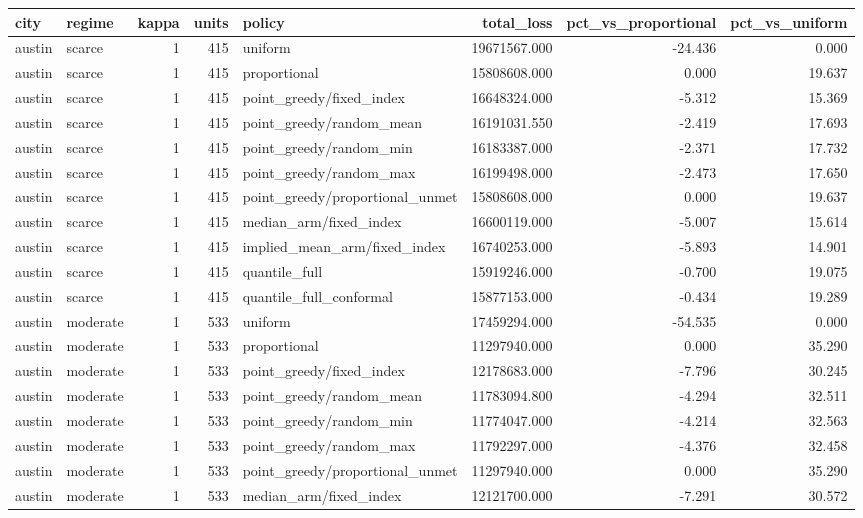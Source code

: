 \begin{tabular}{llrrlrrr}
\toprule
city & regime & kappa & units & policy & total\_loss & pct\_vs\_proportional & pct\_vs\_uniform \\
\midrule
austin & scarce & 1 & 415 & uniform & 19671567.000 & -24.436 & 0.000 \\
austin & scarce & 1 & 415 & proportional & 15808608.000 & 0.000 & 19.637 \\
austin & scarce & 1 & 415 & point\_greedy/fixed\_index & 16648324.000 & -5.312 & 15.369 \\
austin & scarce & 1 & 415 & point\_greedy/random\_mean & 16191031.550 & -2.419 & 17.693 \\
austin & scarce & 1 & 415 & point\_greedy/random\_min & 16183387.000 & -2.371 & 17.732 \\
austin & scarce & 1 & 415 & point\_greedy/random\_max & 16199498.000 & -2.473 & 17.650 \\
austin & scarce & 1 & 415 & point\_greedy/proportional\_unmet & 15808608.000 & 0.000 & 19.637 \\
austin & scarce & 1 & 415 & median\_arm/fixed\_index & 16600119.000 & -5.007 & 15.614 \\
austin & scarce & 1 & 415 & implied\_mean\_arm/fixed\_index & 16740253.000 & -5.893 & 14.901 \\
austin & scarce & 1 & 415 & quantile\_full & 15919246.000 & -0.700 & 19.075 \\
austin & scarce & 1 & 415 & quantile\_full\_conformal & 15877153.000 & -0.434 & 19.289 \\
austin & moderate & 1 & 533 & uniform & 17459294.000 & -54.535 & 0.000 \\
austin & moderate & 1 & 533 & proportional & 11297940.000 & 0.000 & 35.290 \\
austin & moderate & 1 & 533 & point\_greedy/fixed\_index & 12178683.000 & -7.796 & 30.245 \\
austin & moderate & 1 & 533 & point\_greedy/random\_mean & 11783094.800 & -4.294 & 32.511 \\
austin & moderate & 1 & 533 & point\_greedy/random\_min & 11774047.000 & -4.214 & 32.563 \\
austin & moderate & 1 & 533 & point\_greedy/random\_max & 11792297.000 & -4.376 & 32.458 \\
austin & moderate & 1 & 533 & point\_greedy/proportional\_unmet & 11297940.000 & 0.000 & 35.290 \\
austin & moderate & 1 & 533 & median\_arm/fixed\_index & 12121700.000 & -7.291 & 30.572 \\

\end{tabular}

